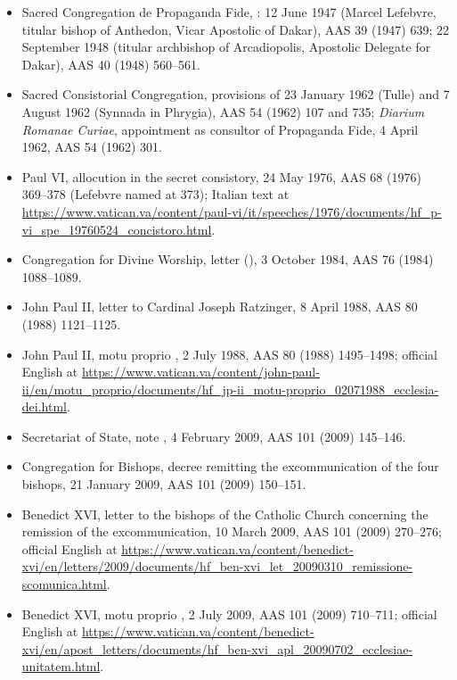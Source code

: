 \begin{itemize}
\item Sacred Congregation de Propaganda Fide, : 12 June 1947 (Marcel Lefebvre, titular bishop of Anthedon,
Vicar Apostolic of Dakar), AAS 39 (1947) 639; 22 September 1948 (titular
archbishop of Arcadiopolis, Apostolic Delegate for Dakar), AAS 40 (1948)
560--561.
\item Sacred Consistorial Congregation, provisions of 23 January 1962
(Tulle) and 7 August 1962 (Synnada in Phrygia), AAS 54 (1962) 107 and
735; \textit{Diarium Romanae Curiae}, appointment as consultor of
Propaganda Fide, 4 April 1962, AAS 54 (1962) 301.
\item Paul VI, allocution in the secret consistory, 24 May 1976, AAS 68
(1976) 369--378 (Lefebvre named at 373); Italian text at
\url{https://www.vatican.va/content/paul-vi/it/speeches/1976/documents/hf_p-vi_spe_19760524_concistoro.html}.
\item Congregation for Divine Worship, letter  (), 3 October 1984, AAS 76 (1984) 1088--1089.
\item John Paul II, letter to Cardinal Joseph Ratzinger, 8 April 1988,
AAS 80 (1988) 1121--1125.
\item John Paul II, motu proprio , 2 July 1988, AAS 80
(1988) 1495--1498; official English at
\url{https://www.vatican.va/content/john-paul-ii/en/motu_proprio/documents/hf_jp-ii_motu-proprio_02071988_ecclesia-dei.html}.
\item Secretariat of State, note , 4 February 2009, AAS 101
(2009) 145--146.
\item Congregation for Bishops, decree remitting the excommunication of
the four bishops, 21 January 2009, AAS 101 (2009) 150--151.
\item Benedict XVI, letter to the bishops of the Catholic Church
concerning the remission of the excommunication, 10 March 2009, AAS 101
(2009) 270--276; official English at
\url{https://www.vatican.va/content/benedict-xvi/en/letters/2009/documents/hf_ben-xvi_let_20090310_remissione-scomunica.html}.
\item Benedict XVI, motu proprio , 2 July 2009,
AAS 101 (2009) 710--711; official English at
\url{https://www.vatican.va/content/benedict-xvi/en/apost_letters/documents/hf_ben-xvi_apl_20090702_ecclesiae-unitatem.html}.

\end{itemize}
